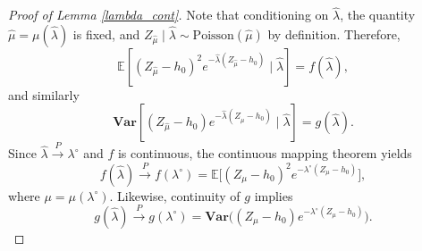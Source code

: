 \documentclass[10pt,a4paper]{amsart}
\begin{document}
\begin{proof}[Proof of Lemma \ref{lambda_cont}]
Note that conditioning on $\hat\lambda$, the quantity $\hat\mu=\mu(\hat\lambda)$ is fixed, and
$Z_{\hat\mu}\mid \hat\lambda \sim \mathrm{Poisson}(\hat\mu)$ by definition. Therefore,
\[
\mathbb{E}\!\left[(Z_{\hat{\mu}}-h_0)^2e^{-\hat{\lambda}(Z_{\hat{\mu}}-h_0)}\mid \hat{\lambda}\right]
= f(\hat\lambda),
\]
and similarly
\[
\mathbf{Var}\!\left[(Z_{\hat{\mu}}-h_0)e^{-\hat{\lambda}(Z_{\hat{\mu}}-h_0)}\mid \hat{\lambda}\right]
= g(\hat\lambda).
\]
Since $\hat\lambda\xrightarrow{P}\lambda^{\circ}$ and $f$ is continuous, the continuous mapping theorem yields
\[
f(\hat\lambda)\xrightarrow{P} f(\lambda^{\circ})
=\mathbb{E}\Big[(Z_{\mu}-h_0)^2e^{-\lambda^{\circ}(Z_{\mu}-h_0)}\Big],
\]
where $\mu=\mu(\lambda^{\circ})$. Likewise, continuity of $g$ implies
\[
g(\hat\lambda)\xrightarrow{P} g(\lambda^{\circ})
=\mathbf{Var}\Big((Z_{\mu}-h_0)e^{-\lambda^{\circ}(Z_{\mu}-h_0)}\Big).
\]

\end{proof}
\end{document}
